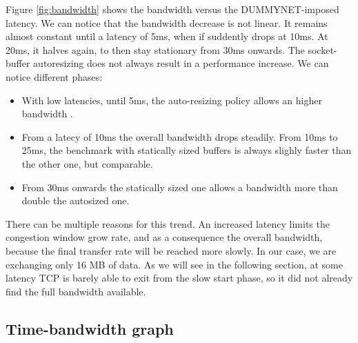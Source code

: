 \documentclass[a4paper,10pt]{article}
\begin{document}
Figure \ref{fig:bandwidth} shows the bandwidth versus the DUMMYNET-imposed latency. We can notice that the bandwidth decrease is not linear. It remains almost constant until a latency of 5ms, when if suddently drops at 10ms. At 20ms, it halves again, to then stay stationary from 30ms onwards.
The socket-buffer autoresizing does not always result in a performance increase. We can notice different phases:
\begin{itemize}
   \item With low latencies, until 5ms, the auto-resizing policy allows an higher bandwidth . %
   \item From a latecy of 10ms the overall bandwidth drops steadily. From 10ms to 25ms, the benchmark with statically sized buffers is always slighly faster than the other one, but comparable.
   \item From 30ms onwards the statically sized one allows a bandwidth more than double the autosized one. %
\end{itemize}

There can be multiple reasons for this trend. 
An increased latency limits the congestion window grow rate, and as a consequence the overall bandwidth, because the final transfer rate will be reached more slowly. In our case, we are exchanging only 16 MB of data. As we will see in the following section, at some latency TCP is barely able to exit from the slow start phase, so it did not already find the full bandwidth available.

\subsection{Time-bandwidth graph}
\end{document}

